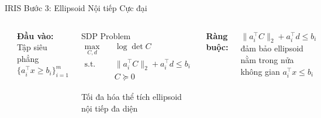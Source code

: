 \documentclass[aspectratio=169]{beamer}
\begin{document}
\begin{frame}{IRIS Bước 3: Ellipsoid Nội tiếp Cực đại}
    \begin{columns}[c]
        \includegraphics[width=\textwidth]{../imgs/iris_2.png}

        
        \textbf{Đầu vào:} Tập siêu phẳng $\{a_i^\top x \geq b_i\}_{i=1}^m$

        \begin{block}{SDP Problem}
            \small
            \[
                \begin{aligned}
                    \max_{C,d} \quad  & \log \det C                            \\
                    \text{s.t.} \quad & \|a_i^\top C\|_2 + a_i^\top d \leq b_i \\
                                      & C \succeq 0
                \end{aligned}
            \]

            Tối đa hóa thể tích ellipsoid nội tiếp đa diện
        \end{block}

        \vspace{0.5em}
        \textbf{Ràng buộc:}
        
        $\|a_i^\top C\|_2 + a_i^\top d \leq b_i$ đảm bảo ellipsoid nằm trong nửa không gian $a_i^\top x \leq b_i$
    \end{columns}
\end{frame}
\end{document}
